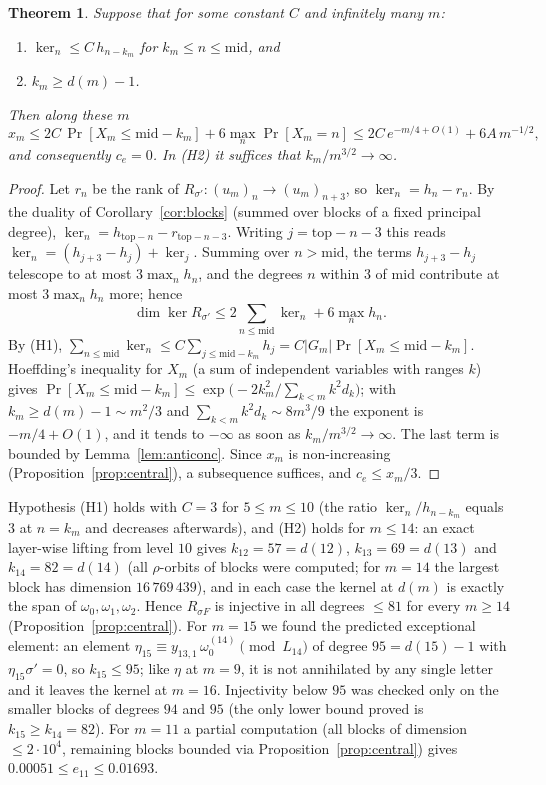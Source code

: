 \documentclass[11pt]{amsart}
\newtheorem{theorem}{Theorem}[section]
\theoremstyle{definition}
\begin{document}
\begin{theorem}\label{thm:conditional}
Suppose that for some constant $C$ and infinitely many $m$:
\begin{enumerate}
\item[(H1)] $\ker_n\le C\,h_{n-k_m}$ for $k_m\le n\le\mathrm{mid}$, and
\item[(H2)] $k_m\ge d(m)-1$.
\end{enumerate}
Then along these $m$
\[
  x_m\le 2C\,\Pr[X_m\le\mathrm{mid}-k_m]+6\max_n\Pr[X_m=n]\le 2C\,e^{-m/4+O(1)}+6A\,m^{-1/2},
\]
and consequently $c_e=0$. In (H2) it suffices that $k_m/m^{3/2}\to\infty$.
\end{theorem}

\begin{proof}
Let $r_n$ be the rank of $R_{\sigma'}:(u_m)_n\to(u_m)_{n+3}$, so $\ker_n=h_n-r_n$. By the duality of
Corollary~\ref{cor:blocks} (summed over blocks of a fixed principal degree), $\ker_n=h_{\mathrm{top}-n}-r_{\mathrm{top}-n-3}$.
Writing $j=\mathrm{top}-n-3$ this reads $\ker_n=(h_{j+3}-h_j)+\ker_j$. Summing over $n>\mathrm{mid}$, the terms
$h_{j+3}-h_j$ telescope to at most $3\max_nh_n$, and the degrees $n$ within $3$ of $\mathrm{mid}$ contribute at most
$3\max_nh_n$ more; hence
\[
  \dim\ker R_{\sigma'}\le 2\sum_{n\le\mathrm{mid}}\ker_n+6\max_nh_n .
\]
By (H1), $\sum_{n\le\mathrm{mid}}\ker_n\le C\sum_{j\le\mathrm{mid}-k_m}h_j=C|G_m|\Pr[X_m\le\mathrm{mid}-k_m]$.
Hoeffding's inequality for $X_m$ (a sum of independent variables with ranges $k$) gives
$\Pr[X_m\le\mathrm{mid}-k_m]\le\exp\bigl(-2k_m^2/\sum_{k<m}k^2d_k\bigr)$; with $k_m\ge d(m)-1\sim m^2/3$ and
$\sum_{k<m}k^2d_k\sim8m^3/9$ the exponent is $-m/4+O(1)$, and it tends to $-\infty$ as soon as $k_m/m^{3/2}\to\infty$.
The last term is bounded by Lemma~\ref{lem:anticonc}. Since $x_m$ is non-increasing (Proposition~\ref{prop:central}),
a subsequence suffices, and $c_e\le x_m/3$.
\end{proof}

Hypothesis (H1) holds with $C=3$ for $5\le m\le10$ (the ratio $\ker_n/h_{n-k_m}$ equals $3$ at $n=k_m$ and decreases
afterwards), and (H2) holds for $m\le 14$: an exact layer-wise lifting from level $10$ gives $k_{12}=57=d(12)$,
$k_{13}=69=d(13)$ and $k_{14}=82=d(14)$ (all $\rho$-orbits of blocks were computed; for $m=14$ the largest block has dimension $16\,769\,439$),
and in each case the kernel at $d(m)$ is exactly the span of $\omega_0,\omega_1,\omega_2$. Hence $R_{\sigma F}$ is injective in all degrees $\le81$ for
every $m\ge14$ (Proposition~\ref{prop:central}). For $m=15$ we found the predicted exceptional element: an element
$\eta_{15}\equiv y_{13,1}\,\omega^{(14)}_0\pmod{L_{14}}$ of degree $95=d(15)-1$ with $\eta_{15}\sigma'=0$, so $k_{15}\le95$; like $\eta$ at $m=9$, it is not annihilated by any single letter and it leaves the kernel at $m=16$.
Injectivity below $95$ was checked only on the smaller blocks of degrees $94$ and $95$ (the only lower bound proved is
$k_{15}\ge k_{14}=82$). For $m=11$ a partial computation (all blocks of dimension $\le 2\cdot10^4$,
remaining blocks bounded via Proposition~\ref{prop:central}) gives $0.00051\le e_{11}\le 0.01693$.
\end{document}
